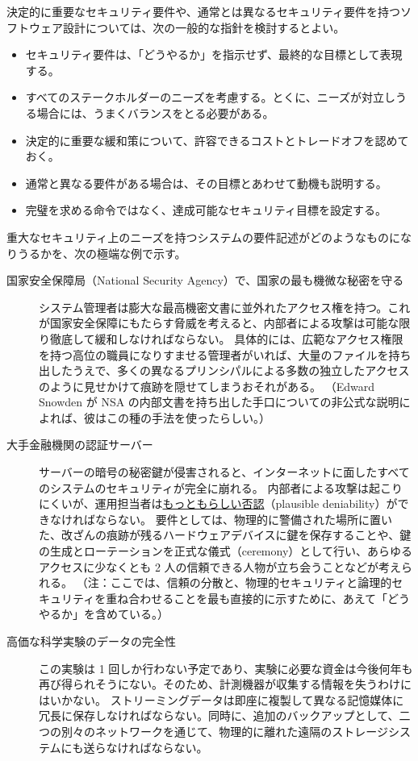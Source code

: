 \documentclass[uplatex]{jsarticle}
\def\label#1{}%
\begin{document}
決定的に重要なセキュリティ要件や、通常とは異なるセキュリティ要件を持つソフトウェア設計については、次の一般的な指針を検討するとよい。
\begin{itemize}
\item セキュリティ要件は、「どうやるか」を指示せず、最終的な目標として表現する。
\item すべてのステークホルダーのニーズを考慮する。とくに、ニーズが対立しうる場合には、うまくバランスをとる必要がある。
\item 決定的に重要な緩和策について、許容できるコストとトレードオフを認めておく。
\item 通常と異なる要件がある場合は、その目標とあわせて動機も説明する。
\item 完璧を求める命令ではなく、達成可能なセキュリティ目標を設定する。
\end{itemize}

重大なセキュリティ上のニーズを持つシステムの要件記述がどのようなものになりうるかを、次の極端な例で示す。

\begin{exa}[重大なセキュリティ上のニーズを持つシステムの要件記述]\label{exa:ch6-extreme-requirements}
\begin{description}
\item[国家安全保障局（National Security Agency）で、国家の最も機微な秘密を守る]
システム管理者は膨大な最高機密文書に並外れたアクセス権を持つ。これが国家安全保障にもたらす脅威を考えると、内部者による攻撃は可能な限り徹底して緩和しなければならない。
具体的には、広範なアクセス権限を持つ高位の職員になりすませる管理者がいれば、大量のファイルを持ち出したうえで、多くの異なるプリンシパルによる多数の独立したアクセスのように見せかけて痕跡を隠せてしまうおそれがある。
（Edward Snowden が NSA の内部文書を持ち出した手口についての非公式な説明によれば、彼はこの種の手法を使ったらしい。）

\item[大手金融機関の認証サーバー]
サーバーの暗号の秘密鍵が侵害されると、インターネットに面したすべてのシステムのセキュリティが完全に崩れる。
内部者による攻撃は起こりにくいが、運用担当者は\underline{もっともらしい否認}（plausible deniability）ができなければならない。
要件としては、物理的に警備された場所に置いた、改ざんの痕跡が残るハードウェアデバイスに鍵を保存することや、鍵の生成とローテーションを正式な儀式（ceremony）として行い、あらゆるアクセスに少なくとも 2 人の信頼できる人物が立ち会うことなどが考えられる。
（注：ここでは、信頼の分散と、物理的セキュリティと論理的セキュリティを重ね合わせることを最も直接的に示すために、あえて「どうやるか」を含めている。）

\item[高価な科学実験のデータの完全性]
この実験は 1 回しか行わない予定であり、実験に必要な資金は今後何年も再び得られそうにない。そのため、計測機器が収集する情報を失うわけにはいかない。
ストリーミングデータは即座に複製して異なる記憶媒体に冗長に保存しなければならない。同時に、追加のバックアップとして、二つの別々のネットワークを通じて、物理的に離れた遠隔のストレージシステムにも送らなければならない。
\end{description}
\end{exa}
\end{document}
